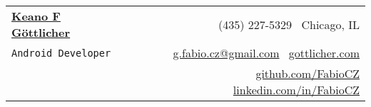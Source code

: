 \documentclass[letterpaper,11pt]{article}
\begin{document}
\newcommand{\mywebheader}{
\begin{tabular*}{7in}{l@{\extracolsep{\fill}}r}
	\textbf{\href{http://www.gottlicher.com/}{\LARGE Keano F G{\" o}ttlicher}} & \faPhone \ (435) 227-5329 \faHome \ Chicago, IL\\
	{\texttt{{Android Developer}}} & \faEnvelope \ \href{mailto:g.fabio.cz@gmail.com}{g.fabio.cz@gmail.com} \faGlobe \  \href{http://www.gottlicher.com}{gottlicher.com}\\
	  & \faGithub \  \href{http://www.github.com/FabioCZ}{github.com/FabioCZ} \faLinkedin \  \href{http://www.linkedin.com/in/FabioCZ}{linkedin.com/in/FabioCZ}
	\end{tabular*}
\\
\vspace{0.1in}}

\mywebheader
\end{document}
